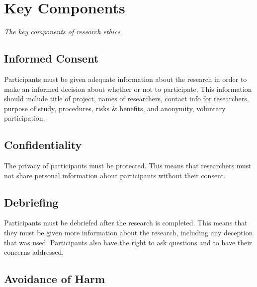 \documentclass[
  b5paper]{book}
\begin{document}
\hypertarget{key-components}{%
\section*{Key Components}\label{key-components}}

\emph{The key components of research ethics}

\hypertarget{informed-consent}{%
\subsection*{Informed Consent}\label{informed-consent}}

Participants must be given adequate information about the research in order to make an informed decision about whether or not to participate. This information should include title of project, names of researchers, contact info for researchers, purpose of study, procedures, risks \& benefits, and anonymity, voluntary participation.

\hypertarget{confidentiality}{%
\subsection*{Confidentiality}\label{confidentiality}}

The privacy of participants must be protected. This means that researchers must not share personal information about participants without their consent.

\hypertarget{debriefing}{%
\subsection*{Debriefing}\label{debriefing}}

Participants must be debriefed after the research is completed. This means that they must be given more information about the research, including any deception that was used. Participants also have the right to ask questions and to have their concerns addressed.

\hypertarget{avoidance-of-harm}{%
\subsection*{Avoidance of Harm}\label{avoidance-of-harm}}
\end{document}
